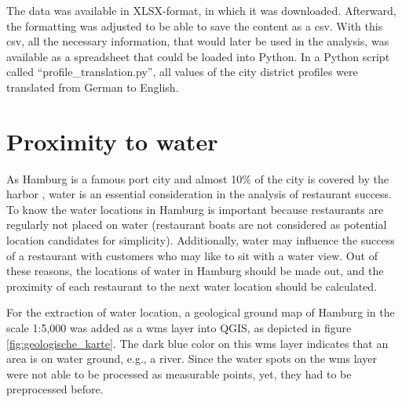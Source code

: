 \documentclass[a4paper, 11pt, oneside]{Thesis}  %
\begin{document}
The data was available in XLSX-format, in which it was downloaded. Afterward, the formatting was adjusted to be able to save the content as a \ac{csv}. With this \ac{csv}, all the necessary information, that would later be used in the analysis, was available as a spreadsheet that could be loaded into Python. In a Python script called ``profile\_translation.py'', all values of the city district profiles were translated from German to English.

\section{Proximity to water}
\label{proximity_to_water}

As Hamburg is a famous port city and almost 10\% of the city is covered by the harbor \cite{HamburgStadt2019}, water is an essential consideration in the analysis of restaurant success. To know the water locations in Hamburg is important because restaurants are regularly not placed on water (restaurant boats are not considered as potential location candidates for simplicity). Additionally, water may influence the success of a restaurant with customers who may like to sit with a water view. Out of these reasons, the locations of water in Hamburg should be made out, and the proximity of each restaurant to the next water location should be calculated.

For the extraction of water location, a geological ground map of Hamburg in the scale 1:5,000 \cite{GeologischeKarte2019} was added as a \ac{wms} layer into QGIS, as depicted in figure \ref{fig:geologische_karte}. The dark blue color on this \ac{wms} layer indicates that an area is on water ground, e.g., a river. Since the water spots on the \ac{wms} layer were not able to be processed as measurable points, yet, they had to be preprocessed before. 
\end{document}
